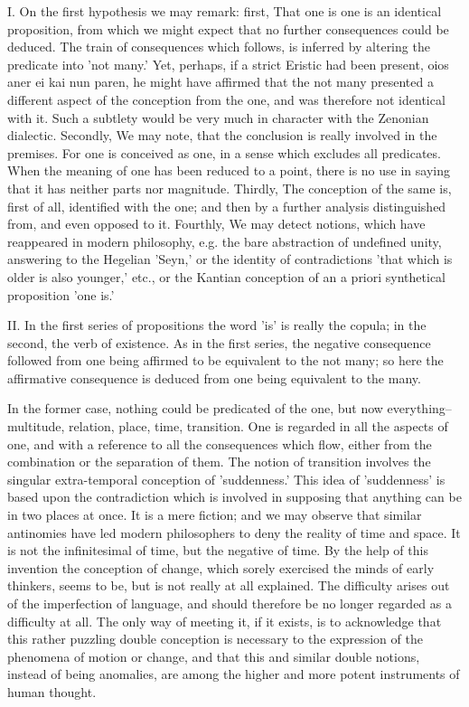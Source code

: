 I. On the first hypothesis we may remark: first, That one is one is
an identical proposition, from which we might expect that no further
consequences could be deduced. The train of consequences which follows,
is inferred by altering the predicate into 'not many.' Yet, perhaps, if
a strict Eristic had been present, oios aner ei kai nun paren, he might
have affirmed that the not many presented a different aspect of the
conception from the one, and was therefore not identical with it. Such
a subtlety would be very much in character with the Zenonian dialectic.
Secondly, We may note, that the conclusion is really involved in the
premises. For one is conceived as one, in a sense which excludes all
predicates. When the meaning of one has been reduced to a point, there
is no use in saying that it has neither parts nor magnitude. Thirdly,
The conception of the same is, first of all, identified with the one;
and then by a further analysis distinguished from, and even opposed to
it. Fourthly, We may detect notions, which have reappeared in modern
philosophy, e.g. the bare abstraction of undefined unity, answering to
the Hegelian 'Seyn,' or the identity of contradictions 'that which is
older is also younger,' etc., or the Kantian conception of an a priori
synthetical proposition 'one is.'

II. In the first series of propositions the word 'is' is really the
copula; in the second, the verb of existence. As in the first series,
the negative consequence followed from one being affirmed to be
equivalent to the not many; so here the affirmative consequence is
deduced from one being equivalent to the many.

In the former case, nothing could be predicated of the one, but now
everything--multitude, relation, place, time, transition. One is
regarded in all the aspects of one, and with a reference to all the
consequences which flow, either from the combination or the separation
of them. The notion of transition involves the singular extra-temporal
conception of 'suddenness.' This idea of 'suddenness' is based upon the
contradiction which is involved in supposing that anything can be in two
places at once. It is a mere fiction; and we may observe that similar
antinomies have led modern philosophers to deny the reality of time and
space. It is not the infinitesimal of time, but the negative of time.
By the help of this invention the conception of change, which sorely
exercised the minds of early thinkers, seems to be, but is not really
at all explained. The difficulty arises out of the imperfection of
language, and should therefore be no longer regarded as a difficulty at
all. The only way of meeting it, if it exists, is to acknowledge that
this rather puzzling double conception is necessary to the expression
of the phenomena of motion or change, and that this and similar double
notions, instead of being anomalies, are among the higher and more
potent instruments of human thought.

